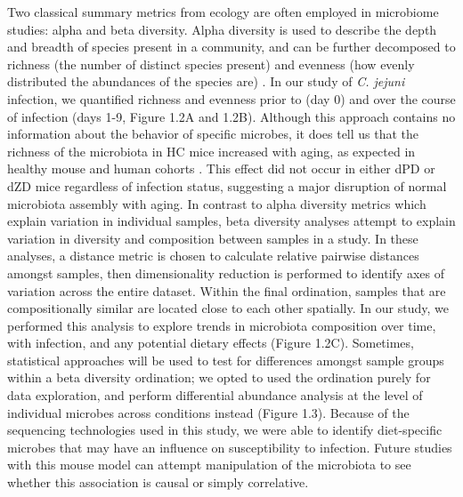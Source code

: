 \documentclass[11pt,twocolumn,notitlepage,openany,twoside]{book}
\begin{document}
\begin{refsection}
Two classical summary metrics from ecology are often employed in microbiome studies: alpha and beta diversity. Alpha diversity is used to describe the depth and breadth of species present in a community, and can be further decomposed to richness (the number of distinct species present) and evenness (how evenly distributed the abundances of the species are) \cite{Morris2014-mq}. In our study of \textit{C. jejuni} infection, we quantified richness and evenness prior to (day 0) and over the course of infection (days 1-9, Figure 1.2A and 1.2B). Although this approach contains no information about the behavior of specific microbes, it does tell us that the richness of the microbiota in HC mice increased with aging, as expected in healthy mouse and human cohorts \cite{Avershina2014-gx, Pantoja-Feliciano2013-il}. This effect did not occur in either dPD or dZD mice regardless of infection status, suggesting a major disruption of normal microbiota assembly with aging. In contrast to alpha diversity metrics which explain variation in individual samples, beta diversity analyses attempt to explain variation in diversity and composition between samples in a study. In these analyses, a distance metric is chosen to calculate relative pairwise distances amongst samples, then dimensionality reduction is performed to identify axes of variation across the entire dataset. Within the final ordination, samples that are compositionally similar are located close to each other spatially. In our study, we performed this analysis to explore trends in microbiota composition over time, with infection, and any potential dietary effects (Figure 1.2C). Sometimes, statistical approaches will be used to test for differences amongst sample groups within a beta diversity ordination; we opted to used the ordination purely for data exploration, and perform differential abundance analysis at the level of individual microbes across conditions instead (Figure 1.3). Because of the sequencing technologies used in this study, we were able to identify diet-specific microbes that may have an influence on susceptibility to infection. Future studies with this mouse model can attempt manipulation of the microbiota to see whether this association is causal or simply correlative.


\end{refsection}
\end{document}
